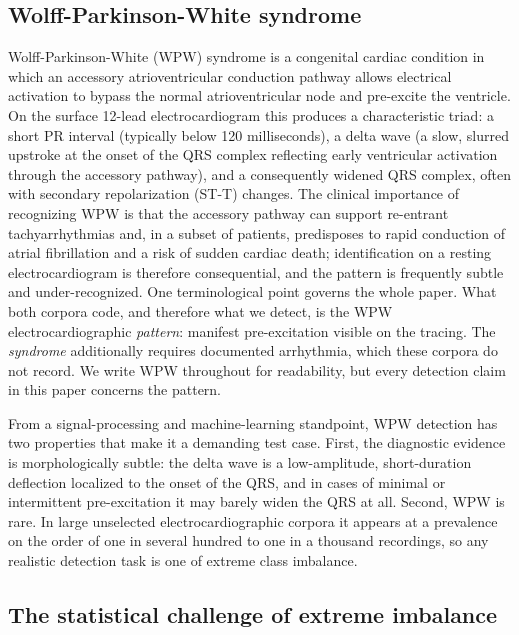 \documentclass[11pt]{article}
\begin{document}
\subsection{Wolff-Parkinson-White syndrome}

Wolff-Parkinson-White (WPW) syndrome is a congenital cardiac condition in which an accessory atrioventricular conduction pathway allows electrical activation to bypass the normal atrioventricular node and pre-excite the ventricle. On the surface 12-lead electrocardiogram this produces a characteristic triad: a short PR interval (typically below 120 milliseconds), a delta wave (a slow, slurred upstroke at the onset of the QRS complex reflecting early ventricular activation through the accessory pathway), and a consequently widened QRS complex, often with secondary repolarization (ST-T) changes. The clinical importance of recognizing WPW is that the accessory pathway can support re-entrant tachyarrhythmias and, in a subset of patients, predisposes to rapid conduction of atrial fibrillation and a risk of sudden cardiac death; identification on a resting electrocardiogram is therefore consequential, and the pattern is frequently subtle and under-recognized. One terminological point governs the whole paper. What both corpora code, and therefore what we detect, is the WPW electrocardiographic \emph{pattern}: manifest pre-excitation visible on the tracing. The \emph{syndrome} additionally requires documented arrhythmia, which these corpora do not record. We write WPW throughout for readability, but every detection claim in this paper concerns the pattern.

From a signal-processing and machine-learning standpoint, WPW detection has two properties that make it a demanding test case. First, the diagnostic evidence is morphologically subtle: the delta wave is a low-amplitude, short-duration deflection localized to the onset of the QRS, and in cases of minimal or intermittent pre-excitation it may barely widen the QRS at all. Second, WPW is rare. In large unselected electrocardiographic corpora it appears at a prevalence on the order of one in several hundred to one in a thousand recordings, so any realistic detection task is one of extreme class imbalance.

\subsection{The statistical challenge of extreme imbalance}
\end{document}

